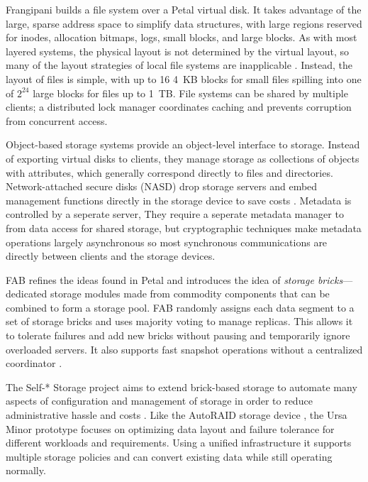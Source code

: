 Frangipani \cite{thekkath} builds a file system over a Petal virtual disk. It takes advantage of the large, sparse address space to simplify data structures, with large regions reserved for inodes, allocation bitmaps, logs, small blocks, and large blocks. As with most layered systems, the physical layout is not determined by the virtual layout, so many of the layout strategies of local file systems are inapplicable \cite{stein05}. Instead, the layout of files is simple, with up to 16 4~KB blocks for small files spilling into one of $2^24$ large blocks for files up to 1~TB. File systems can be shared by multiple clients; a distributed lock manager coordinates caching and prevents corruption from concurrent access.

Object-based storage systems \cite{mesnier} provide an object-level interface to storage. Instead of exporting virtual disks to clients, they manage storage as collections of objects with attributes, which generally correspond directly to files and directories. Network-attached secure disks (NASD) drop storage servers and embed management functions directly in the storage device to save costs \cite{gibson97,gibson98a}. Metadata is controlled by a seperate server, They require a seperate metadata manager to from data access for shared storage, but cryptographic techniques make metadata operations largely asynchronous so most synchronous communications are directly between clients and the storage devices. 

FAB \cite{frolund,saito04} refines the ideas found in Petal and introduces the idea of \emph{storage bricks}---dedicated storage modules made from commodity components that can be combined to form a storage pool. FAB randomly assigns each data segment to a set of storage bricks and uses majority voting to manage replicas. This allows it to tolerate failures and add new bricks without pausing and temporarily ignore overloaded servers. It also supports fast snapshot operations without a centralized coordinator \cite{ji}.

The Self-* Storage project aims to extend brick-based storage to automate many aspects of configuration and management of storage in order to reduce administrative hassle and costs \cite{ganger03}. Like the AutoRAID storage device \cite{wilkes95}, the Ursa Minor prototype \cite{abd-el-malek} focuses on optimizing data layout and failure tolerance for different workloads and requirements. Using a unified infrastructure it supports multiple storage policies and can convert existing data while still operating normally.

